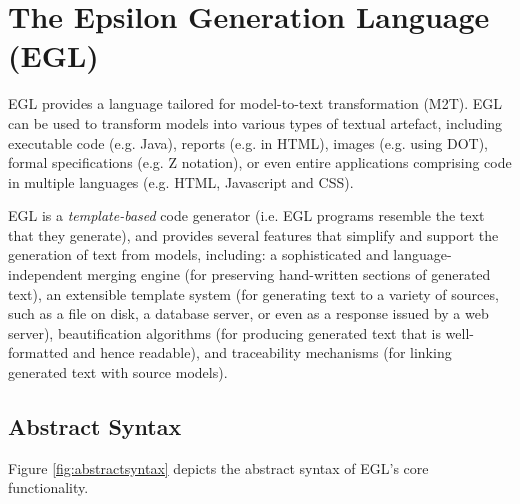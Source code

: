 
\chapter{The Epsilon Generation Language (EGL)}
\label{sec:EGL}
EGL provides a language tailored for model-to-text transformation (M2T). EGL can be used to transform models into various types of textual artefact, including executable code (e.g. Java), reports (e.g. in HTML), images (e.g. using DOT), formal specifications (e.g. Z notation), or even entire applications comprising code in multiple languages (e.g. HTML, Javascript and CSS).

EGL is a \emph{template-based} code generator (i.e. EGL programs resemble the text that they generate), and provides several features that simplify and support the generation of text from models, including: a sophisticated and language-independent merging engine (for preserving hand-written sections of generated text), an extensible template system (for generating text to a variety of sources, such as a file on disk, a database server, or even as a response issued by a web server), beautification algorithms (for producing generated text that is well-formatted and hence readable), and traceability mechanisms (for linking generated text with source models). 




\section{Abstract Syntax}
Figure \ref{fig:abstractsyntax} depicts the abstract syntax of EGL's core functionality.

